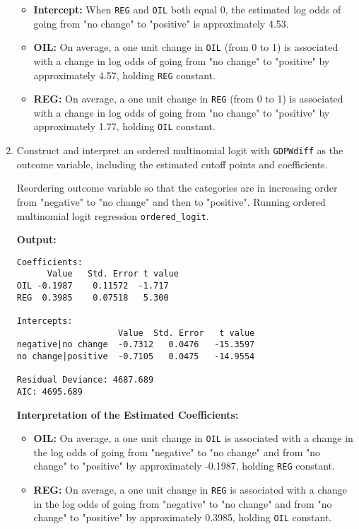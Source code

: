 \documentclass[12pt,letterpaper]{article}
\begin{document}
\begin{enumerate}
\begin{itemize}
	\item \textbf{Intercept:} When \texttt{REG} and \texttt{OIL} both equal 0, the estimated log odds of going from "no change" to "positive" is approximately 4.53. 
	\item \textbf{OIL:} On average, a one unit change in \texttt{OIL} (from 0 to 1) is associated with a change in log odds of going from "no change" to "positive" by approximately 4.57, holding \texttt{REG} constant.
	\item \textbf{REG:} On average, a one unit change in \texttt{REG} (from 0 to 1) is associated with a change in log odds of going from "no change" to "positive" by approximately 1.77, holding \texttt{OIL} constant.
\end{itemize}
		
			\vspace{0.5cm}
	\item Construct and interpret an ordered multinomial logit with \texttt{GDPWdiff} as the outcome variable, including the estimated cutoff points and coefficients.
	
	\noindent  Reordering outcome variable so that the categories are in increasing order  from "negative" to "no change" and then to "positive". Running ordered multinomial logit regression  \texttt{ordered\_logit}. 
	
	 
	\noindent \textbf{Output:}
	
	\begin{footnotesize}
		\begin{verbatim}
Coefficients:      
      Value   Std. Error t value
OIL -0.1987    0.11572  -1.717
REG  0.3985    0.07518   5.300

Intercepts:                   
                    Value  Std. Error   t value 
negative|no change  -0.7312   0.0476   -15.3597
no change|positive  -0.7105   0.0475   -14.9554

Residual Deviance: 4687.689 
AIC: 4695.689
		\end{verbatim}  
	\end{footnotesize}
	
		\vspace{0.5cm}	
	\textbf{Interpretation of the Estimated Coefficients:}
	
	\begin{itemize}
		\item \textbf{OIL:} On average, a one unit change in \texttt{OIL} is associated with a change in the log odds of going from "negative" to "no change" and from "no change" to "positive" by approximately -0.1987, holding \texttt{REG} constant.
		\item \textbf{REG:} On average, a one unit change in \texttt{REG} is associated with a change in the log odds of going from "negative" to "no change" and from "no change" to "positive" by approximately 0.3985, holding \texttt{OIL} constant.
	\end{itemize}
\end{enumerate}
\end{document}
